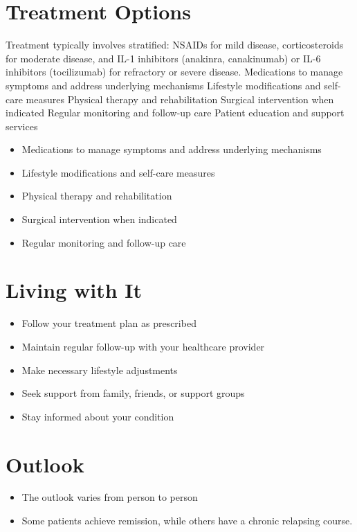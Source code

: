 \section{Treatment Options}
Treatment typically involves stratified: NSAIDs for mild disease, corticosteroids for moderate disease, and IL-1 inhibitors (anakinra, canakinumab) or IL-6 inhibitors (tocilizumab) for refractory or severe disease. Medications to manage symptoms and address underlying mechanisms Lifestyle modifications and self-care measures Physical therapy and rehabilitation Surgical intervention when indicated Regular monitoring and follow-up care Patient education and support services

\begin{itemize}[noitemsep]
  \item Medications to manage symptoms and address underlying mechanisms
  \item Lifestyle modifications and self-care measures
  \item Physical therapy and rehabilitation
  \item Surgical intervention when indicated
  \item Regular monitoring and follow-up care
\end{itemize}
\section{Living with It}
\begin{itemize}[noitemsep]
  \item Follow your treatment plan as prescribed
  \item Maintain regular follow-up with your healthcare provider
  \item Make necessary lifestyle adjustments
  \item Seek support from family, friends, or support groups
  \item Stay informed about your condition
\end{itemize}
\section{Outlook}
\begin{itemize}[noitemsep]
  \item The outlook varies from person to person
  \item Some patients achieve remission, while others have a chronic relapsing course.
\end{itemize}
